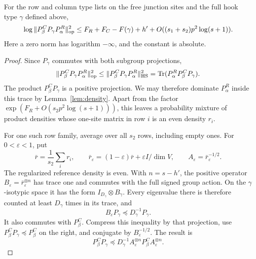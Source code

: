 \begin{lemma}\label{lem:overlap}
For the row and column type lists on the free junction sites and the full
hook type \(\gamma\) defined above,
\begin{equation}
 \log\|P_\beta^C P_\gamma P_\alpha^R\|_{\rm op}^2
 \le F_R+F_C-F(\gamma)+h'
       +O((s_1+s_2)p^2\log(s+1)).
 \label{ac:eq:19}
\end{equation}
Here a zero norm has logarithm \(-\infty\), and the constant is absolute.
\end{lemma}
\begin{proof}
Since \(P_\gamma\) commutes with both subgroup projections,
\[
 \|P_\beta^C P_\gamma P_\alpha^R\|_{\rm op}^2
 \le\|P_\beta^C P_\gamma P_\alpha^R\|_{\rm HS}^2
 =\operatorname{Tr}(P_\alpha^R P_\beta^C P_\gamma).
\]
The product \(P_\beta^C P_\gamma\) is a positive projection. We may
therefore dominate \(P_\alpha^R\) inside this trace by
Lemma~\ref{lem:density}. Apart from the factor
\(\exp(F_R+O(s_2p^2\log(s+1)))\), this leaves a probability mixture
of product densities whose one-site matrix in row \(i\) is an even
density \(r_i\).

For one such row family, average over all \(s_2\) rows, including empty
ones. For \(0<\varepsilon<1\), put
\[
 \bar r=\frac1{s_2}\sum_i r_i,\qquad
 \bar r_\varepsilon=(1-\varepsilon)\bar r+\varepsilon I/\dim V,
 \qquad A_\varepsilon=\bar r_\varepsilon^{-1/2}.
\]
The regularized reference density is even. With \(n=s-h'\), the positive
operator \(B_\varepsilon=\bar r_\varepsilon^{\otimes n}\) has trace one
and commutes with the full signed group action. On the
\(\gamma\)-isotypic space it has the form \(I_{D_\gamma}\otimes B_\gamma\).
Every eigenvalue there is therefore counted at least \(D_\gamma\) times
in its trace, and
\[
 B_\varepsilon P_\gamma\preceq D_\gamma^{-1}P_\gamma.
\]
It also commutes with \(P_\beta^C\). Compress this inequality by that
projection, use \(P_\beta^C P_\gamma\preceq P_\beta^C\) on the right, and
conjugate by \(B_\varepsilon^{-1/2}\). The result is
\[
 P_\beta^C P_\gamma
 \preceq D_\gamma^{-1}
 A_\varepsilon^{\otimes n}P_\beta^C A_\varepsilon^{\otimes n}.
\]


\end{proof}
